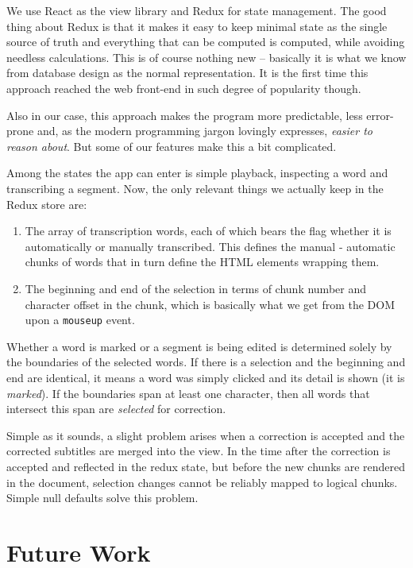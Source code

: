 \documentclass{svproc}
\begin{document}
We use React as the view library and Redux\cite{abramov2015redux} for state
management. The good thing about Redux is that it makes it easy to keep minimal
state as the single source of truth and everything that can be computed is
computed, while avoiding needless calculations. This is of course nothing new --
basically it is what we know from database design as the normal
representation\cite{codd1970relational}. It is the first time this approach
reached the web front-end in such degree of popularity though.

Also in our case, this approach makes the program more predictable, less
error-prone and, as the modern programming jargon lovingly expresses, {\em
easier to reason about}. But some of our features make this a bit complicated.

Among the states the app can enter is simple playback, inspecting a word and
transcribing a segment. Now, the only relevant things we actually keep in the
Redux store are:

\begin{enumerate}
\item{
    The array of transcription words, each of which bears the flag whether it is
    automatically or manually transcribed. This defines the manual - automatic
    chunks of words that in turn define the HTML elements wrapping them.
}
\item{
    The beginning and end of the selection in terms of chunk number and
    character offset in the chunk, which is basically what we get from the DOM
    upon a \texttt{mouseup} event.
}
\end{enumerate}

Whether a word is marked or a segment is being edited is determined solely by
the boundaries of the selected words. If there is a selection and the beginning
and end are identical, it means a word was simply clicked and its detail is
shown (it is {\em marked}). If the boundaries span at least one character, then
all words that intersect this span are {\em selected} for correction.

Simple as it sounds, a slight problem arises when a correction is accepted and
the corrected subtitles are merged into the view. In the time after the
correction is accepted and reflected in the redux state, but before the new
chunks are rendered in the document, selection changes cannot be reliably mapped
to logical chunks. Simple null defaults solve this problem.

\section{Future Work}
\end{document}
